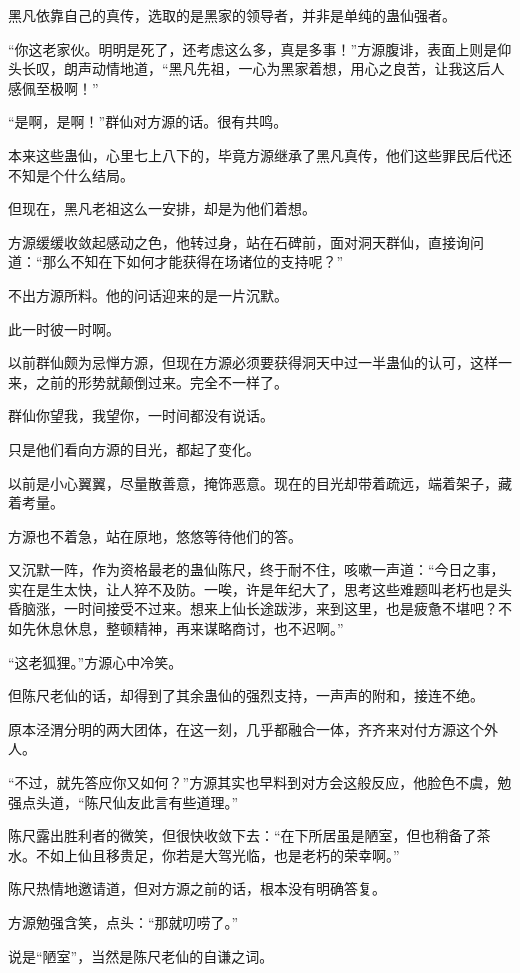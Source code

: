 \begin{this_body}
黑凡依靠自己的真传，选取的是黑家的领导者，并非是单纯的蛊仙强者。

“你这老家伙。明明是死了，还考虑这么多，真是多事！”方源腹诽，表面上则是仰头长叹，朗声动情地道，“黑凡先祖，一心为黑家着想，用心之良苦，让我这后人感佩至极啊！”

“是啊，是啊！”群仙对方源的话。很有共鸣。

本来这些蛊仙，心里七上八下的，毕竟方源继承了黑凡真传，他们这些罪民后代还不知是个什么结局。

但现在，黑凡老祖这么一安排，却是为他们着想。

方源缓缓收敛起感动之色，他转过身，站在石碑前，面对洞天群仙，直接询问道：“那么不知在下如何才能获得在场诸位的支持呢？”

不出方源所料。他的问话迎来的是一片沉默。

此一时彼一时啊。

以前群仙颇为忌惮方源，但现在方源必须要获得洞天中过一半蛊仙的认可，这样一来，之前的形势就颠倒过来。完全不一样了。

群仙你望我，我望你，一时间都没有说话。

只是他们看向方源的目光，都起了变化。

以前是小心翼翼，尽量散善意，掩饰恶意。现在的目光却带着疏远，端着架子，藏着考量。

方源也不着急，站在原地，悠悠等待他们的答。

又沉默一阵，作为资格最老的蛊仙陈尺，终于耐不住，咳嗽一声道：“今日之事，实在是生太快，让人猝不及防。一唉，许是年纪大了，思考这些难题叫老朽也是头昏脑涨，一时间接受不过来。想来上仙长途跋涉，来到这里，也是疲惫不堪吧？不如先休息休息，整顿精神，再来谋略商讨，也不迟啊。”

“这老狐狸。”方源心中冷笑。

但陈尺老仙的话，却得到了其余蛊仙的强烈支持，一声声的附和，接连不绝。

原本泾渭分明的两大团体，在这一刻，几乎都融合一体，齐齐来对付方源这个外人。

“不过，就先答应你又如何？”方源其实也早料到对方会这般反应，他脸色不虞，勉强点头道，“陈尺仙友此言有些道理。”

陈尺露出胜利者的微笑，但很快收敛下去：“在下所居虽是陋室，但也稍备了茶水。不如上仙且移贵足，你若是大驾光临，也是老朽的荣幸啊。”

陈尺热情地邀请道，但对方源之前的话，根本没有明确答复。

方源勉强含笑，点头：“那就叨唠了。”

说是“陋室”，当然是陈尺老仙的自谦之词。


\end{this_body}
